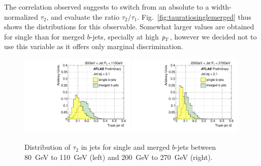 The correlation observed suggests to switch from an absolute to a width-normalized $\tau_2$, and evaluate the ratio $\tau_2/\tau_1$. Fig.~\ref{fig:tauratiosinglemerged} thus shows the distributions for this observable. Somewhat larger values are obtained for single than for merged $b$-jets, specially at high ${\emph{p}_{T}}$, however we decided not to use this variable as it offers only marginal discrimination. 

\vspace{3 mm}

\begin{figure}[tp]
\centering
\includegraphics[width=0.49\textwidth]{FIGS/VarsSingleMerged/Tau2080.pdf}
\includegraphics[width=0.49\textwidth]{FIGS/VarsSingleMerged/Tau2200.pdf}
\caption{Distribution of $\tau_2$ in jets for single and merged $b$-jets between 80~GeV to 110~GeV (left) and 200~GeV to 270~GeV (right).}
\label{fig:tau2singlemerged}
\end{figure}

